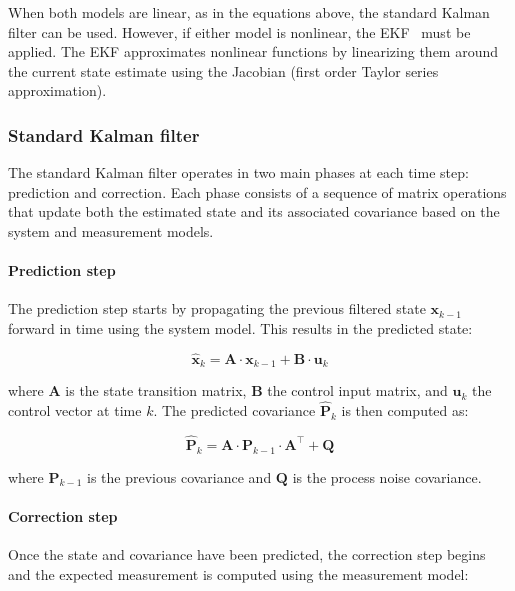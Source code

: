 When both models are linear, as in the equations above, the standard Kalman filter can be used. However, if 
either model is nonlinear, the \gls{EKF}~\cite{ekf} must be applied. The \gls{EKF} approximates 
nonlinear functions by linearizing them around the current state estimate using the Jacobian (first order Taylor series approximation).

\subsubsection{Standard Kalman filter}\label{sec:KalmanFilterClassic}

The standard Kalman filter operates in two main phases at each time step: prediction and correction. Each
phase consists of a sequence of matrix operations that update both the estimated state and its associated
covariance based on the system and measurement models. 

\paragraph{Prediction step}

The prediction step starts by propagating the previous
filtered state $\mathbf{x}_{k-1}$ forward in time using the system model. This results in the predicted state:

\begin{equation}
  \hat{\mathbf{x}}_k = \mathbf{A} \cdot \mathbf{x}_{k-1} + \mathbf{B} \cdot \mathbf{u}_k
\end{equation}

where $\mathbf{A}$ is the state transition matrix, $\mathbf{B}$ the control input matrix, and 
$\mathbf{u}_k$ the control vector at time $k$. The predicted covariance $\hat{\mathbf{P}}_k$ is then computed as:

\begin{equation}
  \hat{\mathbf{P}}_k = \mathbf{A} \cdot \mathbf{P}_{k-1} \cdot \mathbf{A}^\top + \mathbf{Q}
\end{equation}

where $\mathbf{P}_{k-1}$ is the previous covariance and $\mathbf{Q}$ is the process noise covariance. 

\paragraph{Correction step}

Once the state and covariance have been predicted, the correction step begins and the expected measurement is computed using the measurement model:

